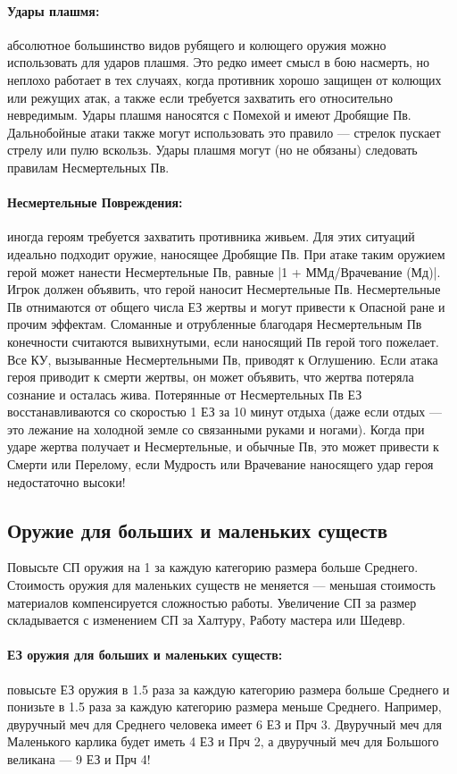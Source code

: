 \paragraph{Удары плашмя:} абсолютное большинство видов рубящего и колющего оружия можно использовать для ударов плашмя. Это редко имеет смысл в бою насмерть, но неплохо работает в тех случаях, когда противник хорошо защищен от колющих или режущих атак, а также если требуется захватить его относительно невредимым. Удары плашмя наносятся с Помехой и имеют Дробящие Пв. Дальнобойные атаки также могут использовать это правило — стрелок пускает стрелу или пулю вскользь. Удары плашмя могут (но не обязаны) следовать правилам Несмертельных Пв.
\paragraph{Несмертельные Повреждения:} иногда героям требуется захватить противника живьем. Для этих ситуаций идеально подходит оружие, наносящее Дробящие Пв. При атаке таким оружием герой может нанести Несмертельные Пв, равные |1 + ММд/Врачевание (Мд)|. Игрок должен объявить, что герой наносит Несмертельные Пв.
Несмертельные Пв отнимаются от общего числа ЕЗ жертвы и могут привести к Опасной ране и прочим эффектам. Сломанные и отрубленные благодаря Несмертельным Пв конечности считаются вывихнутыми, если наносящий Пв герой того пожелает. Все КУ, вызыванные Несмертельными Пв, приводят к Оглушению. Если атака героя приводит к смерти жертвы, он может объявить, что жертва потеряла сознание и осталась жива. Потерянные от Несмертельных Пв ЕЗ восстанавливаются со скоростью 1 ЕЗ за 10 минут отдыха (даже если отдых — это лежание на холодной земле со связанными руками и ногами).
\newline
Когда при ударе жертва получает и Несмертельные, и обычные Пв, это может привести к Смерти или Перелому, если Мудрость или Врачевание наносящего удар героя недостаточно высоки!
\subsection{Оружие для больших и маленьких существ}
Повысьте СП оружия на 1 за каждую категорию размера больше Среднего. Стоимость оружия для маленьких существ не меняется — меньшая стоимость материалов компенсируется сложностью работы. Увеличение СП за размер складывается с изменением СП за Халтуру, Работу мастера или Шедевр.
\paragraph{ЕЗ оружия для больших и маленьких существ:} повысьте ЕЗ оружия в 1.5 раза за каждую категорию размера больше Среднего и понизьте в 1.5 раза за каждую категорию размера меньше Среднего. Например, двуручный меч для Среднего человека имеет 6 ЕЗ и Прч 3. Двуручный меч для Маленького карлика будет иметь 4 ЕЗ и Прч 2, а двуручный меч для Большого великана — 9 ЕЗ и Прч 4!



